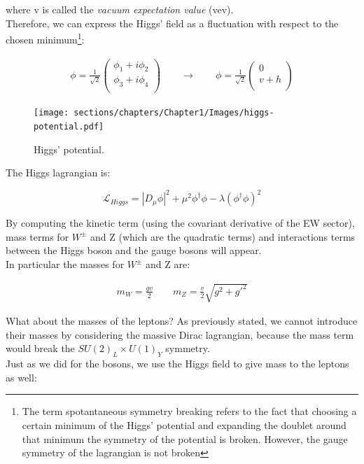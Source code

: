 where v is called the \textit{vacuum expectation value} (vev).\\
Therefore, we can express the Higgs' field as a fluctuation with respect to the chosen minimum\footnote[1]{The term
spotantaneous symmetry breaking refers to the fact that choosing a certain minimum of the Higgs' potential 
and expanding the doublet around that minimum the symmetry of the potential is broken.
However, the gauge symmetry of the lagrangian is not broken}:

\begin{align}
    \phi = \frac{1}{\sqrt{2}}
    \begin{pmatrix}
        \phi_1 + i \phi_2\\
        \phi_3 + i \phi_4\\
    \end{pmatrix}
    \qquad
    \rightarrow
    \qquad
    \phi = \frac{1}{\sqrt{2}}
    \begin{pmatrix}
        0 \\
        v + h\\
    \end{pmatrix}
\end{align}

\begin{figure}
    \centering
    \texttt{[image: sections/chapters/Chapter1/Images/higgs-potential.pdf]}
    \caption{Higgs' potential.}
\end{figure}


The Higgs lagrangian is:

\begin{equation}
    \mathcal{L}_{Higgs} = |D_{\mu} \phi|^2 + \mu^2 \phi^{\dagger} \phi - \lambda (\phi^{\dagger} \phi)^2
\end{equation}

By computing the kinetic term (using the covariant derivative of the EW sector), mass terms for $W^{\pm}$ and Z 
(which are the quadratic terms) and interactions terms between the Higgs boson and the gauge bosons
will appear.\\
In particular the masses for $W^{\pm}$ and Z are:

\begin{align}
    m_W = \frac{gv}{2}
    \qquad
    m_Z = \frac{v}{2} \sqrt{g^2 + g'^2}
\end{align}

What about the masses of the leptons?
As previously stated, we cannot introduce their masses by considering the massive Dirac lagrangian, because the mass
term would break the $SU(2)_L \times U(1)_Y$ symmetry.\\
Just as we did for the bosons, we use the Higgs field to give mass to the leptons as well:

